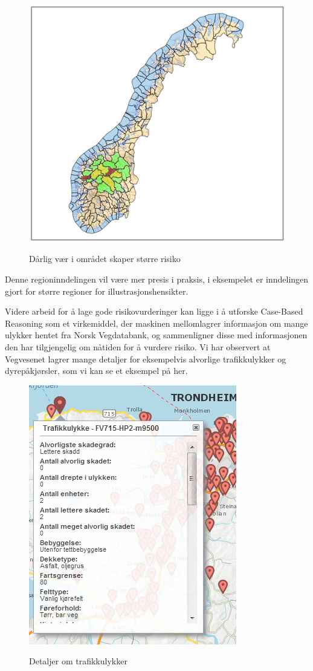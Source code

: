 \documentclass[a4paper,norsk,oneside]{book}
\begin{document}
\begin{figure}[H]
\centering
\includegraphics[scale=0.5]{figs/regioner.png}
\label{trafikkulykke}
\caption{Dårlig vær i området skaper større risiko}
\end{figure}

Denne regioninndelingen vil være mer presis i praksis, i eksempelet er inndelingen gjort for større regioner for illustrasjonshensikter.

Videre arbeid for å lage gode risikovurderinger kan ligge i å utforske Case-Based Reasoning som et virkemiddel, der maskinen mellomlagrer informasjon om mange ulykker hentet fra Norsk Vegdatabank, og sammenligner disse med informasjonen den har tilgjengelig om nåtiden for å vurdere risiko. Vi har observert at Vegvesenet lagrer mange detaljer for eksempelvis alvorlige trafikkulykker og dyrepåkjørsler, som vi kan se et eksempel på her.

\begin{figure}[H]
\centering
\includegraphics[scale=0.5]{figs/trafikkulykke.png}
\label{trafikkulykke}
\caption{Detaljer om trafikkulykker}
\end{figure}
\end{document}
